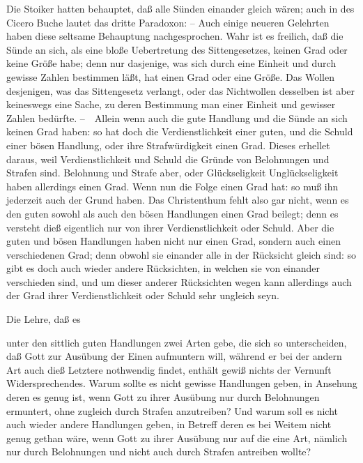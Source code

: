 \begin{aufza}
\item Die Stoiker hatten behauptet, daß alle Sünden einander gleich wären; auch in des Cicero Buche  lautet das dritte Paradoxon:  -- Auch einige neueren Gelehrten haben diese seltsame Behauptung nachgesprochen. Wahr ist es freilich, daß die Sünde an sich, als eine bloße Uebertretung des Sittengesetzes, keinen Grad oder keine Größe habe; denn nur dasjenige, was sich durch eine Einheit und durch gewisse Zahlen bestimmen läßt, hat einen Grad oder eine Größe. Das Wollen desjenigen, was das Sittengesetz verlangt, oder das Nichtwollen desselben ist aber keineswegs eine Sache, zu deren Bestimmung man einer Einheit und gewisser Zahlen bedürfte. --~\ Allein wenn auch die gute Handlung und die Sünde an sich keinen Grad haben: so hat doch die Verdienstlichkeit einer guten, und die Schuld einer bösen Handlung, oder ihre Strafwürdigkeit einen Grad. Dieses erhellet daraus, weil Verdienstlichkeit und Schuld die Gründe von Belohnungen und Strafen sind. Belohnung und Strafe aber, oder Glückseligkeit  Unglückseligkeit haben allerdings einen Grad. Wenn nun die Folge einen Grad hat: so muß ihn jederzeit auch der Grund haben. Das Christenthum fehlt also gar nicht, wenn es den guten sowohl als auch den bösen Handlungen einen Grad beilegt; denn es versteht dieß eigentlich nur von ihrer Verdienstlichkeit oder Schuld. Aber die guten und bösen Handlungen haben nicht nur einen Grad, sondern auch einen verschiedenen Grad; denn obwohl sie einander alle in der Rücksicht gleich sind: so gibt es doch auch wieder andere Rücksichten, in welchen sie von einander verschieden sind, und um dieser anderer Rücksichten wegen kann allerdings auch der Grad ihrer Verdienstlichkeit oder Schuld sehr ungleich seyn.
\item Die Lehre, daß es
\begin{aufzb}
\item unter den sittlich guten Handlungen zwei Arten gebe, die sich so unterscheiden, daß Gott zur Ausübung der Einen  aufmuntern will,  während er bei der andern Art auch dieß Letztere nothwendig findet, enthält gewiß nichts der Vernunft Widersprechendes. Warum sollte es nicht gewisse Handlungen geben, in Ansehung deren es genug ist, wenn Gott zu ihrer Ausübung nur durch Belohnungen ermuntert, ohne zugleich durch Strafen anzutreiben? Und warum soll es nicht auch wieder andere Handlungen geben, in Betreff deren es bei Weitem nicht genug gethan wäre, wenn Gott zu ihrer Ausübung nur auf die eine Art, nämlich nur durch Belohnungen und nicht auch durch Strafen antreiben wollte?

\end{aufzb}
\end{aufza}
